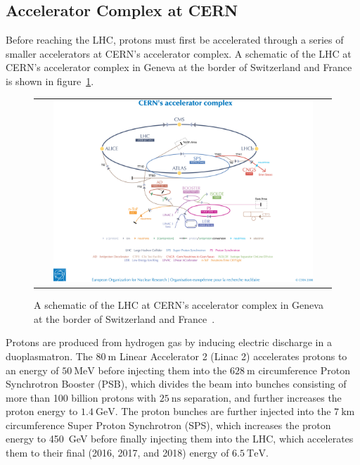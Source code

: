 \subsection{Accelerator Complex at CERN}
Before reaching the LHC, protons must first be accelerated through a series of smaller accelerators at CERN's accelerator complex.
A schematic of the LHC at CERN's accelerator complex in Geneva at the border of Switzerland and France is shown in figure~\ref{CERN_LHC}.
\begin{figure}[!h]
  \begin{center}
    \begin{tabular}{c}
        \includegraphics[width=0.9\textwidth]{fig_LHC_CMS/CERN_LHC.png}
    \end{tabular}
    \caption{A schematic of the LHC at CERN's accelerator complex in Geneva at the border of Switzerland and France~\cite{Christiane:1260465}.
            }
    \label{CERN_LHC}
  \end{center}
\end{figure}
Protons are produced from hydrogen gas by inducing electric discharge in a duoplasmatron.
The $\SI{80}{\m}$ Linear Accelerator 2 (Linac 2) accelerates protons to an energy of $\SI{50}{\MeV}$ before injecting them into the $\SI{628}{\m}$ circumference Proton Synchrotron Booster (PSB), which divides the beam into bunches consisting of more than 100 billion protons with $\SI{25}{\ns}$ separation, and further increases the proton energy to $\SI{1.4}{\GeV}$.
The proton bunches are further injected into the $\SI{7}{\km}$ circumference Super Proton Synchrotron (SPS), which increases the proton energy to \SI{450}{\GeV} before finally injecting them into the LHC, which accelerates them to their final (2016, 2017, and 2018) energy of $\SI{6.5}{\TeV}$.
